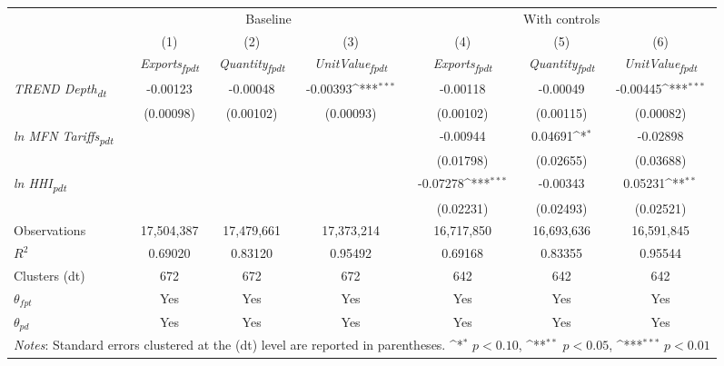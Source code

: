 {
\def\sym#1{\ifmmode^{#1}\else\(^{#1}\)\fi}
\begin{tabular}{l*{6}{c}}
\toprule
&\multicolumn{3}{c}{Baseline}&\multicolumn{3}{c}{With controls}\\\cmidrule(lr){2-4}\cmidrule(lr){5-7}
&(1)&(2)&(3)&(4)&(5)&(6)\\
&\textit{Exports\textsubscript{fpdt}}&\textit{Quantity\textsubscript{fpdt}}&\textit{UnitValue\textsubscript{fpdt}}&\textit{Exports\textsubscript{fpdt}}&\textit{Quantity\textsubscript{fpdt}}&\textit{UnitValue\textsubscript{fpdt}}\\
\midrule
\textit{TREND Depth\textsubscript{dt}} & -0.00123 & -0.00048 & -0.00393\sym{***} & -0.00118 & -0.00049 & -0.00445\sym{***}\\
 & (0.00098) & (0.00102) & (0.00093) & (0.00102) & (0.00115) & (0.00082)\\
\addlinespace
\textit{ln MFN Tariffs\textsubscript{pdt}} &  &  &  & -0.00944 & 0.04691\sym{*} & -0.02898\\
 &  &  &  & (0.01798) & (0.02655) & (0.03688)\\
\addlinespace
\textit{ln HHI\textsubscript{pdt}} &  &  &  & -0.07278\sym{***} & -0.00343 & 0.05231\sym{**}\\
 &  &  &  & (0.02231) & (0.02493) & (0.02521)\\
\midrule
Observations & 17,504,387 & 17,479,661 & 17,373,214 & 16,717,850 & 16,693,636 & 16,591,845\\
$R^{2}$ & 0.69020 & 0.83120 & 0.95492 & 0.69168 & 0.83355 & 0.95544\\
Clusters (dt) & 672 & 672 & 672 & 642 & 642 & 642\\
$\theta_{fpt}$ & Yes & Yes & Yes & Yes & Yes & Yes\\
$\theta_{pd}$ & Yes & Yes & Yes & Yes & Yes & Yes\\
\bottomrule
\multicolumn{7}{l}{\footnotesize \textit{Notes}: Standard errors clustered at the (dt) level are reported in parentheses. \sym{*} \(p<0.10\), \sym{**} \(p<0.05\), \sym{***} \(p<0.01\)}\\
\end{tabular}
}
